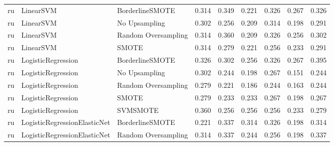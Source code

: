 \begin{tabular}{lllllllll}
      ru &                    LinearSVM &     BorderlineSMOTE &     0.314 &                     0.349 &                 0.221 &                  0.326 &                                   0.267 &     0.326 \\
      ru &                    LinearSVM &       No Upsampling &     0.302 &                     0.256 &                 0.209 &                  0.314 &                                   0.198 &     0.291 \\
      ru &                    LinearSVM & Random Oversampling &     0.314 &                     0.360 &                 0.209 &                  0.326 &                                   0.256 &     0.302 \\
      ru &                    LinearSVM &               SMOTE &     0.314 &                     0.279 &                 0.221 &                  0.256 &                                   0.233 &     0.291 \\
      ru &           LogisticRegression &     BorderlineSMOTE &     0.326 &                     0.302 &                 0.256 &                  0.326 &                                   0.267 &     0.395 \\
      ru &           LogisticRegression &       No Upsampling &     0.302 &                     0.244 &                 0.198 &                  0.267 &                                   0.151 &     0.244 \\
      ru &           LogisticRegression & Random Oversampling &     0.279 &                     0.221 &                 0.186 &                  0.244 &                                   0.163 &     0.244 \\
      ru &           LogisticRegression &               SMOTE &     0.279 &                     0.233 &                 0.233 &                  0.267 &                                   0.198 &     0.267 \\
      ru &           LogisticRegression &            SVMSMOTE &     0.360 &                     0.256 &                 0.256 &                  0.256 &                                   0.233 &     0.279 \\
      ru & LogisticRegressionElasticNet &     BorderlineSMOTE &     0.221 &                     0.337 &                 0.314 &                  0.326 &                                   0.198 &     0.314 \\
      ru & LogisticRegressionElasticNet & Random Oversampling &     0.314 &                     0.337 &                 0.244 &                  0.256 &                                   0.198 &     0.337 \\

\end{tabular}
